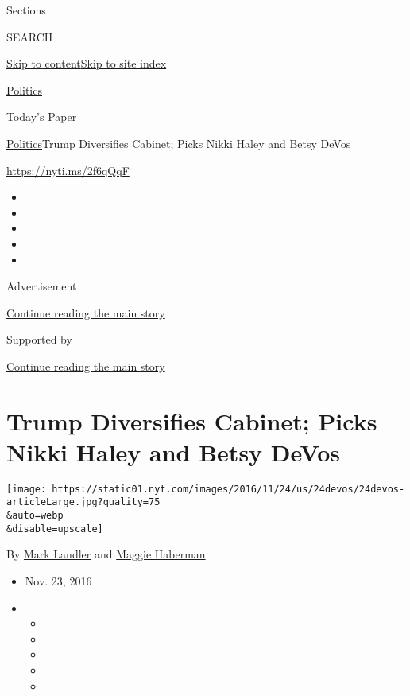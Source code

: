 Sections

SEARCH

\protect\hyperlink{site-content}{Skip to
content}\protect\hyperlink{site-index}{Skip to site index}

\href{https://www.nytimes.com/section/politics}{Politics}

\href{https://myaccount.nytimes.com/auth/login?response_type=cookie\&client_id=vi}{}

\href{https://www.nytimes.com/section/todayspaper}{Today's Paper}

\href{/section/politics}{Politics}\textbar{}Trump Diversifies Cabinet;
Picks Nikki Haley and Betsy DeVos

\url{https://nyti.ms/2f6qQqF}

\begin{itemize}
\item
\item
\item
\item
\item
\end{itemize}

Advertisement

\protect\hyperlink{after-top}{Continue reading the main story}

Supported by

\protect\hyperlink{after-sponsor}{Continue reading the main story}

\hypertarget{trump-diversifies-cabinet-picks-nikki-haley-and-betsy-devos}{%
\section{Trump Diversifies Cabinet; Picks Nikki Haley and Betsy
DeVos}\label{trump-diversifies-cabinet-picks-nikki-haley-and-betsy-devos}}

\texttt{[image: https://static01.nyt.com/images/2016/11/24/us/24devos/24devos-articleLarge.jpg?quality=75\\\&auto=webp\\\&disable=upscale]}

By \href{http://www.nytimes.com/by/mark-landler}{Mark Landler} and
\href{http://www.nytimes.com/by/maggie-haberman}{Maggie Haberman}

\begin{itemize}
\item
  Nov. 23, 2016
\item
  \begin{itemize}
  \item
  \item
  \item
  \item
  \item
  \end{itemize}
\end{itemize}

